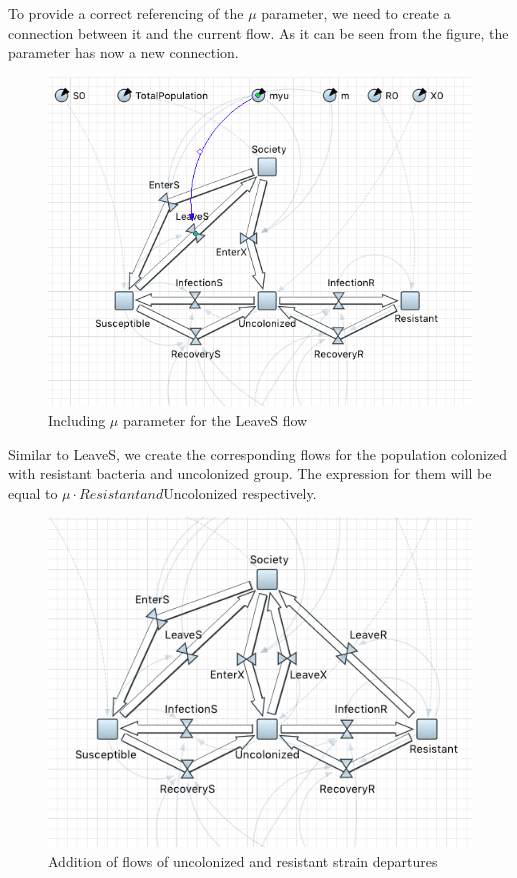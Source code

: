 To provide a correct referencing of the $\mu$ parameter, we need to create a connection between it and the current flow. As it can be seen from the figure, the parameter has now a new connection.

\begin{figure}[H]
  \centering
  \includegraphics[height=0.5\text width]{img/screens/society/society13}
  \caption{Including $\mu$ parameter for the LeaveS flow}
\end{figure}

Similar to LeaveS, we create the corresponding flows for the population colonized with resistant bacteria and uncolonized group. The expression for them will be equal to $\mu \cdot Resistant and $\mu \cdot Uncolonized respectively.

\begin{figure}[H]
  \centering
  \includegraphics[height=0.5\text width]{img/screens/society/society15}
  \caption{Addition of flows of uncolonized and resistant strain departures}
\end{figure}


